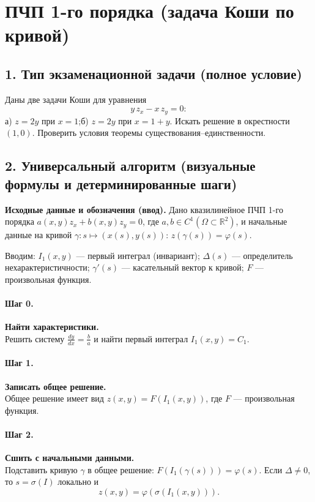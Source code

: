 \section{ПЧП 1-го порядка (задача Коши по кривой)}

\subsection*{1. Тип экзаменационной задачи (полное условие)}
Даны две задачи Коши для уравнения
\[
y\,z_x-x\,z_y=0:
\]
а) \(z=2y\) при \(x=1\);\quad б) \(z=2y\) при \(x=1+y\).
Искать решение в окрестности \((1,0)\). Проверить условия теоремы существования–единственности.

\subsection*{2. Универсальный алгоритм (визуальные формулы и детерминированные шаги)}

\textbf{Исходные данные и обозначения (ввод).} Дано квазилинейное ПЧП 1-го порядка \(a(x,y)z_x+b(x,y)z_y=0\), где \(a,b\in C^1(\Omega\subset\mathbb R^2)\), и начальные данные на кривой \(\gamma:s\mapsto(x(s),y(s))\): \(z(\gamma(s))=\varphi(s)\).

Вводим: \(I_1(x,y)\) — первый интеграл (инвариант); \(\Delta(s)\) — определитель нехарактеристичности; \(\gamma'(s)\) — касательный вектор к кривой; \(F\) — произвольная функция.

\paragraph{Шаг 0.} \textbf{Найти характеристики.}\\
Решить систему \(\displaystyle \frac{dy}{dx}=\frac{b}{a}\) и найти первый интеграл \(I_1(x,y)=C_1\).

\paragraph{Шаг 1.} \textbf{Записать общее решение.}\\
Общее решение имеет вид \(z(x,y)=F(I_1(x,y))\), где \(F\) — произвольная функция.

\paragraph{Шаг 2.} \textbf{Сшить с начальными данными.}\\
Подставить кривую \(\gamma\) в общее решение: \(F(I_1(\gamma(s)))=\varphi(s)\).
Если \(\Delta\neq0\), то \(s=\sigma(I)\) локально и
\[
z(x,y)=\varphi(\sigma(I_1(x,y))).
\]

